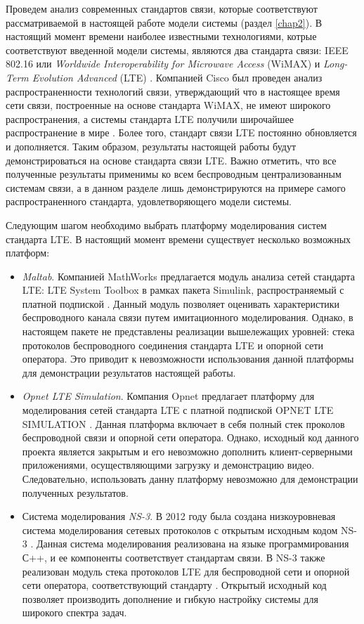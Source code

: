 Проведем анализ современных стандартов связи, которые соответствуют рассматриваемой в настоящей работе модели системы (раздел \ref{chap2}). В настоящий момент времени наиболее известными технологиями, котрые соответствуют введенной модели системы, являются два стандарта связи: IEEE 802.16 или \textit{Worldwide Interoperability for Microwave Access} (WiMAX) \cite{wimax_std} и \textit{Long-Term Evolution Advanced} (LTE) \cite{lte_std}. Компанией Cisco был проведен анализ распространенности технологий связи, утверждающий что в настоящее время сети связи, построенные на основе стандарта WiMAX, не имеют широкого распространения, а системы стандарта LTE получили широчайшее распространение в мире \cite{Cisco}. Более того, стандарт связи LTE постоянно обновляется и дополняется. Таким образом, результаты настоящей работы будут демонстрироваться на основе стандарта связи LTE. Важно отметить, что все полученные результаты применимы ко всем беспроводным централизованным системам связи, а в данном разделе лишь демонстрируются на примере самого распространенного стандарта, удовлетворяющего модели системы.

Следующим шагом необходимо выбрать платформу моделирования систем стандарта LTE. В настоящий момент времени существует несколько возможных платформ:
\begin{itemize}
	\item \textit{Maltab}. Компанией MathWorks предлагается модуль анализа сетей стандарта LTE: LTE System Toolbox в рамках пакета Simulink, распространяемый с платной подпиской \cite{Matlab}. Данный модуль позволяет оценивать характеристики беспроводного канала связи путем имитационного моделирования. Однако, в настоящем пакете не представлены реализации вышележащих уровней: стека протоколов беспроводного соединения стандарта LTE и опорной сети оператора. Это приводит к невозможности использования данной платформы для демонстрации результатов настоящей работы.
	\item \textit{Opnet LTE Simulation}. Компания Opnet предлагает платформу для моделирования сетей стандарта LTE с платной подпиской OPNET LTE SIMULATION \cite{Opnet}. Данная платформа включает в себя полный стек проколов беспроводной связи и опорной сети оператора. Однако, исходный код данного проекта является закрытым и его невозможно дополнить клиент-серверными приложениями, осуществляющими загрузку и демонстрацию видео. Следовательно, использовать данну платформу невозможно для демонстрации полученных результатов.
	\item Система моделирования \textit{NS-3}. В 2012 году была создана низкоуровневая система моделирования сетевых протоколов с открытым исходным кодом NS-3 \cite{ns-3}. Данная система моделирования реализована на языке программирования С++, и ее компоненты соответствует стандартам связи. В NS-3 также реализован модуль стека протоколов LTE для беспроводной сети и опорной сети оператора, соответствующий стандарту \cite{lte_std}. Открытый исходный код позволяет производить дополнение и гибкую настройку системы для широкого спектра задач.
\end{itemize}

